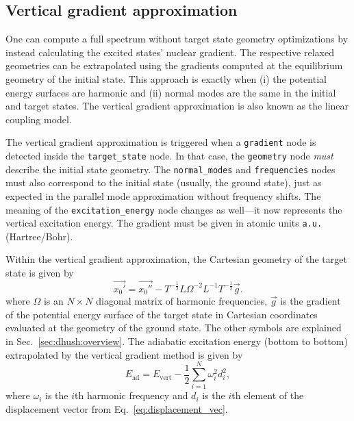 \documentclass[11pt]{article}
\begin{document}
\subsection{Vertical gradient approximation}
\label{sec:para:vertical_gradient}
One can compute a full spectrum without target state geometry optimizations 
by instead calculating the excited states' nuclear gradient. The respective 
relaxed geometries can be extrapolated using the gradients computed at the 
equilibrium geometry of the initial state. This approach is exactly when 
(i) the potential energy surfaces are harmonic and 
(ii) normal modes are the same in the initial and target states.
The vertical gradient approximation is also known as the linear coupling model.

The vertical gradient approximation is triggered when a {\tt{}gradient} node 
is detected inside the {\tt{}target\_state} node. In that case, 
the {\tt{}geometry} node \emph{must} describe the initial state geometry. 
The {\tt{}normal\_modes} and {\tt{}frequencies} nodes must also correspond to the initial state (usually, the ground state), just as expected in the parallel mode
approximation without frequency shifts. The meaning of the {\tt{}excitation\_energy} node changes
as well---it now represents the vertical excitation energy. 
The gradient must be given in atomic units {\tt{}a.u.} (Hartree/Bohr).

Within the vertical gradient approximation, the Cartesian geometry of the target state 
is given by
\begin{equation}
    \label{eq:VG_geometry}
    \vec{x _0 '}
    =
    \vec{x _0 ''}
    -
    T ^{-\frac{1}{2}} L 
    \Omega ^{-2} 
    L ^{-1} T ^{-\frac{1}{2}} 
    \vec{g}.
\end{equation}
where $\Omega$ is an $N \times N$ diagonal matrix of harmonic frequencies, $\vec{g}$ is the gradient
of  the potential energy surface of the target state in Cartesian coordinates evaluated at the geometry of the ground state. The other symbols are explained in Sec.~\ref{sec:dhush:overview}. The adiabatic excitation energy (bottom to bottom) extrapolated by the vertical gradient method is given by
\begin{equation}
    \label{eq:VG_energy}
    E _\text{ad} = E _\text{vert} - \frac{1}{2} \sum _{i = 1} ^N \omega _i ^2 d _i ^2,
\end{equation}
where $\omega _i$ is the $i$th harmonic frequency and $d _i$ is the $i$th element of the displacement vector from Eq.~\eqref{eq:displacement_vec}.
\end{document}
